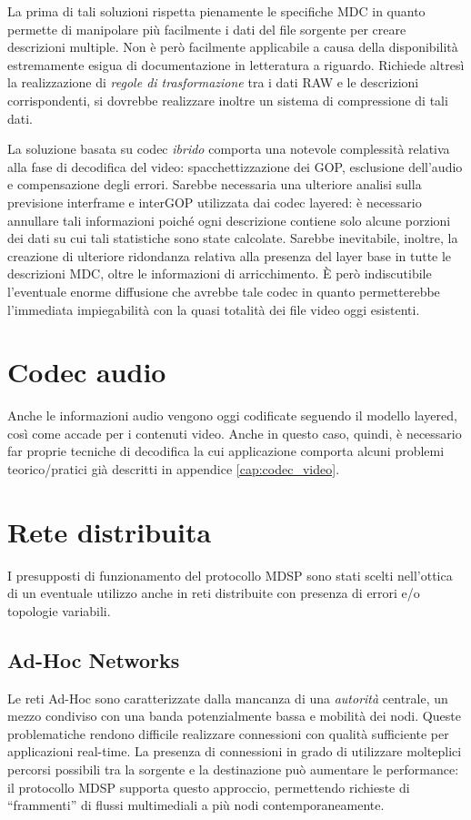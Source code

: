 La prima di tali soluzioni rispetta pienamente le specifiche MDC in quanto
permette di manipolare più facilmente i dati del file sorgente per creare
descrizioni multiple. Non è però facilmente applicabile a causa della
disponibilità estremamente esigua di documentazione in letteratura a riguardo. Richiede
altresì la realizzazione di \emph{regole di trasformazione} tra i dati RAW e le
descrizioni corrispondenti, si dovrebbe realizzare inoltre un sistema di
compressione di tali dati.

La soluzione basata su codec \emph{ibrido} comporta una notevole complessità
relativa alla fase di decodifica del video: spacchettizzazione dei GOP,
esclusione dell'audio e compensazione degli errori. Sarebbe necessaria una
ulteriore analisi sulla previsione interframe e interGOP utilizzata dai codec
layered: è necessario annullare tali informazioni poiché ogni descrizione
contiene solo alcune porzioni dei dati su cui tali statistiche sono state calcolate.
Sarebbe inevitabile, inoltre, la creazione di ulteriore ridondanza relativa
alla presenza del layer base in tutte le descrizioni MDC, oltre le informazioni
di arricchimento. \`E però indiscutibile l'eventuale enorme diffusione che avrebbe
tale codec in quanto permetterebbe l'immediata impiegabilità con la quasi totalità dei file video oggi esistenti.

\section{Codec audio}
Anche le informazioni audio vengono oggi codificate seguendo il modello
layered, così come accade per i contenuti video. Anche in questo caso, quindi,
è necessario far proprie tecniche di decodifica la cui applicazione comporta
alcuni problemi teorico/pratici già descritti in appendice
\ref{cap:codec_video}.

\section{Rete distribuita}
I presupposti di funzionamento del protocollo MDSP sono stati
scelti nell'ottica di un eventuale utilizzo anche in reti distribuite con presenza di
errori e/o topologie variabili.

\subsection{Ad-Hoc Networks}
Le reti Ad-Hoc sono caratterizzate dalla mancanza di una \emph{autorità}
centrale, un mezzo condiviso con una banda potenzialmente bassa e mobilità
dei nodi. Queste problematiche rendono difficile realizzare connessioni con
qualità sufficiente per applicazioni real-time.
La presenza di connessioni in grado di utilizzare molteplici percorsi possibili
tra la sorgente e la destinazione può aumentare le performance: il protocollo
MDSP supporta questo approccio, permettendo richieste di ``frammenti'' di
flussi multimediali a più nodi contemporaneamente.

